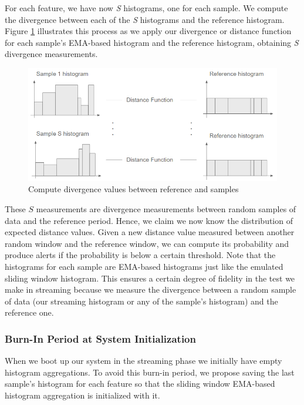 \documentclass[sigconf]{acmart}
\begin{document}
For each feature, we have now \textit{S} histograms, one for each sample. We compute the divergence between each of the \textit{S} histograms and the reference histogram. Figure \ref{fig:compute-sample-distances} illustrates this process as we apply our divergence or distance function for each sample's EMA-based histogram and the reference histogram, obtaining \textit{S} divergence measurements.
\begin{figure}[!htb]
    \begin{center}
      \includegraphics[scale=0.4]{figures/compute-sample-distances.png}
      \caption[Compute sample's distance values]{Compute divergence values between reference and samples}
      \label{fig:compute-sample-distances}
    \end{center}
\end{figure}
These $S$ measurements are divergence measurements between random samples of data and the reference period. Hence, we claim we now know the distribution of expected distance values. Given a new distance value measured between another random window and the reference window, we can compute its probability and produce alerts if the probability is below a certain threshold. Note that the histograms for each sample are EMA-based histograms just like the emulated sliding window histogram. This ensures a certain degree of fidelity in the test we make in streaming because we measure the divergence between a random sample of data (our streaming histogram or any of the sample's histogram) and the reference one.

\subsubsection{Burn-In Period at System Initialization}
When we boot up our system in the streaming phase we initially have empty histogram aggregations. To avoid this burn-in period, we propose saving the last sample's histogram for each feature so that the sliding window EMA-based histogram aggregation is initialized with it.
\end{document}
